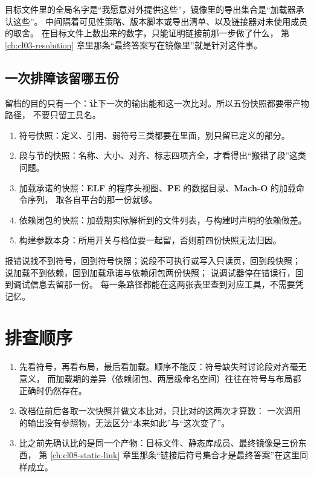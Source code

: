 \documentclass[12pt,a4paper,fontset=fandol]{ctexbook}
\newcommand{\Elf}{\textbf{\textsf{ELF}}}
\newcommand{\PeFmt}{\textbf{\textsf{PE}}}
\newcommand{\Macho}{\textbf{\textsf{Mach-O}}}
\begin{document}
\begin{compare}[title=为什么不能在目标文件上判断导出集合]
目标文件里的全局名字是“我愿意对外提供这些”，镜像里的导出集合是“加载器承认这些”。
中间隔着可见性策略、版本脚本或导出清单、以及链接器对未使用成员的取舍。
在目标文件上数出来的数字，只能证明链接前那一步做了什么，
第 \ref{ch:cl03-resolution} 章里那条“最终答案写在镜像里”就是针对这件事。
\end{compare}

\subsection*{一次排障该留哪五份}

留档的目的只有一个：让下一次的输出能和这一次比对。所以五份快照都要带产物路径，
不要只留工具名。

\begin{enumerate}
\item 符号快照：定义、引用、弱符号三类都要在里面，别只留已定义的部分。
\item 段与节的快照：名称、大小、对齐、标志四项齐全，才看得出“搬错了段”这类问题。
\item 加载承诺的快照：\Elf{} 的程序头视图、\PeFmt{} 的数据目录、\Macho{} 的加载命令序列，
取各自平台的那一份就够。
\item 依赖闭包的快照：加载期实际解析到的文件列表，与构建时声明的依赖做差。
\item 构建参数本身：所用开关与档位要一起留，否则前四份快照无法归因。
\end{enumerate}

\begin{flow}[title=从报错回到工具的顺序]
报错说找不到符号，回到符号快照；说段不可执行或写入只读页，回到段快照；
说加载不到依赖，回到加载承诺与依赖闭包两份快照；
说调试器停在错误行，回到调试信息去留那一份。
每一条路径都能在这两张表里查到对应工具，不需要凭记忆。
\end{flow}

\section{排查顺序}

\begin{guideline}[title=排查顺序三条]
\begin{enumerate}
\item 先看符号，再看布局，最后看加载。顺序不能反：符号缺失时讨论段对齐毫无意义，
而加载期的差异（依赖闭包、两层级命名空间）往往在符号与布局都正确时仍然存在。
\item 改档位前后各取一次快照并做文本比对，只比对的这两次才算数：
一次调用的输出没有参照物，无法区分“本来如此”与“这次变了”。
\item 比之前先确认比的是同一个产物：目标文件、静态库成员、最终镜像是三份东西，
第 \ref{ch:cl08-static-link} 章里那条“链接后符号集合才是最终答案”在这里同样成立。
\end{enumerate}
\end{guideline}
\end{document}
